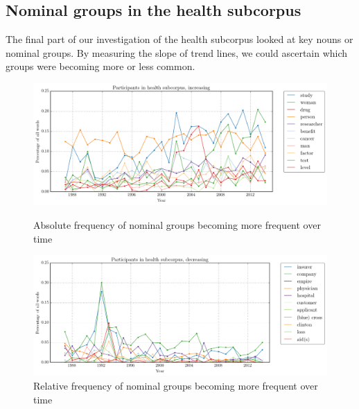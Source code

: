\subsection{Nominal groups in the health subcorpus}

The final part of our investigation of the health subcorpus looked at key nouns or nominal groups. By measuring the slope of trend lines, we could ascertain which groups were becoming more or less common.

    \noindent
    \begin{figure}[htb!]
    \centering
    \begin{minipage}{.45\textwidth}
    \centering
    \includegraphics[width=1\textwidth]{../images/1.png}
    \caption{Absolute frequency of nominal groups becoming more frequent over time}
    \label{fig:1}
    \end{minipage}%
    \begin{minipage}{.45\textwidth}
    \centering
    \includegraphics[width=1\textwidth]{../images/2.png}
    \caption{Relative frequency of nominal groups becoming more frequent over time}
    \label{fig:2}
    \end{minipage}
    \end{figure}
    \noindent
